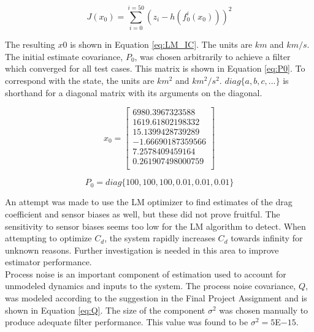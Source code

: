 \documentclass[11pt]{article}
\begin{document}
\begin{equation}
	\label{eq:ICcost}
	J(x_0) = \sum_{i=0}^{i=50} \left( z_i - h(f_{0}^{i}(x_0)) \right)^2 
\end{equation}

The resulting $x0$ is shown in Equation \eqref{eq:LM_IC}. The units are $km$ and $km/s$. The initial estimate covariance, $P_0$, was chosen arbitrarily to achieve a filter which converged for all test cases. This matrix is shown in Equation \eqref{eq:P0}. To correspond with the state, the units are $km^2$ and $km^2/s^2$. $diag \{a, b, c, ... \}$ is shorthand for a diagonal matrix with its arguments on the diagonal.

\begin{equation}
	\label{eq:LM_IC}
	x_0 = \begin{bmatrix}
	6980.3967323588 \\
	1619.61802198332 \\
	15.1399428739289 \\
	-1.66690187359566 \\
	7.2578409459164 \\
	0.261907498000759 \\	
	\end{bmatrix}
\end{equation}

\begin{equation}
	\label{eq:P0}
	P_0 = diag \{ 100, 100, 100, 0.01, 0.01, 0.01 \}
\end{equation}

An attempt was made to use the LM optimizer to find estimates of the drag coefficient and sensor biases as well, but these did not prove fruitful. The sensitivity to sensor biases seems too low for the LM algorithm to detect. When attempting to optimize $C_d$, the system rapidly increases $C_d$ towards infinity for unknown reasons. Further investigation is needed in this area to improve estimator performance. \\

Process noise is an important component of estimation used to account for unmodeled dynamics and inputs to the system. The process noise covariance, $Q$, was modeled according to the suggestion in the Final Project Assignment and is shown in Equation \eqref{eq:Q}. The size of the component $\sigma^2$ was chosen manually to produce adequate filter performance. This value was found to be $\sigma^2 = 5$E$-15$.
\end{document}
